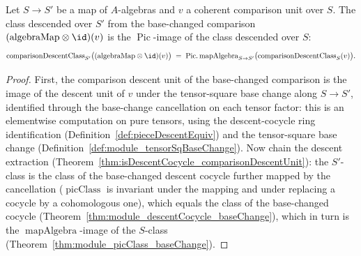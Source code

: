 \begin{theorem}
  \label{thm:comparisonDescentClass_mapAlgebra}
  \leanok
  Let \(S \to S'\) be a map of \(A\)-algebras and \(v\) a coherent comparison unit over \(S\). The
  class descended over \(S'\) from the base-changed comparison \((\mathrm{algebraMap} \otimes \id)(v)\)
  is the \(\operatorname{Pic}\)-image of the class descended over \(S\):
  \[
    \mathrm{comparisonDescentClass}_{S'}\bigl((\mathrm{algebraMap} \otimes \id)(v)\bigr)
      \;=\; \operatorname{Pic.mapAlgebra}_{S \to S'}\bigl(\mathrm{comparisonDescentClass}_S(v)\bigr).
  \]
\end{theorem}
\begin{proof}
  \leanok
  First, the comparison descent unit of the base-changed comparison is the image of the descent unit
  of \(v\) under the tensor-square base change along \(S \to S'\), identified through the
  base-change cancellation on each tensor factor: this is an elementwise computation on pure
  tensors, using the descent-cocycle ring identification (Definition~\ref{def:pieceDescentEquiv}) and
  the tensor-square base change (Definition~\ref{def:module_tensorSqBaseChange}). Now chain the
  descent extraction (Theorem~\ref{thm:isDescentCocycle_comparisonDescentUnit}): the \(S'\)-class is
  the class of the base-changed descent cocycle further mapped by the cancellation
  (\(\operatorname{picClass}\) is invariant under the mapping and under replacing a cocycle by a
  cohomologous one), which equals the class of the base-changed cocycle
  (Theorem~\ref{thm:module_descentCocycle_baseChange}), which in turn is the
  \(\operatorname{mapAlgebra}\)-image of the \(S\)-class
  (Theorem~\ref{thm:module_picClass_baseChange}).
\end{proof}


